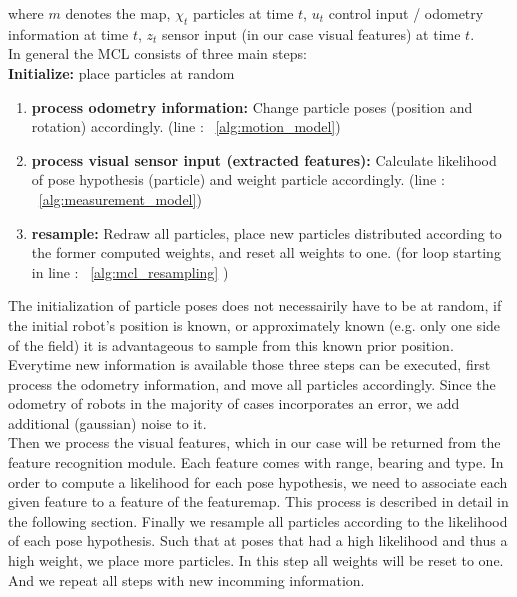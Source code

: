 \documentclass[	DIV=calc,%
							paper=a4,%
							fontsize=9pt,%
							twocolumn]{scrartcl}	 					%
\begin{document}
where $m$ denotes the map, $\chi_t$ particles at time $t$, $u_t$ control input / odometry information at time $t$, $z_t$ sensor input (in our case visual features) at time $t$.
\\
In general the MCL consists of three main steps:\\
\textbf{Initialize:} place particles at random
\begin{enumerate}
\item \textbf{process odometry information:} Change particle poses (position and rotation) accordingly. (line : ~\ref{alg:motion_model})
\item \textbf{process visual sensor input (extracted features):} Calculate likelihood of pose hypothesis (particle) and weight particle accordingly. (line : ~\ref{alg:measurement_model})
\item \textbf{resample:} Redraw all particles, place new particles distributed according to the former computed weights, and reset all weights to one. (for loop starting in line :  ~\ref{alg:mcl_resampling} ) %
\end{enumerate}
The initialization of particle poses does not necessairily have to be at random, if the initial robot's position is known, or approximately known (e.g. only one side of the field) it is advantageous to sample from this known prior position.\\
Everytime new information is available those three steps can be executed, first process the odometry information, and move all particles accordingly. Since the odometry of robots in the majority of cases incorporates an error, we add additional (gaussian) noise to it. \\
Then we process the visual features, which in our case will be returned from the feature recognition module. Each feature comes with range, bearing and type. In order to compute a likelihood for each pose hypothesis, we need to associate each given feature to a feature of the featuremap. This process is described in detail in the following section. Finally we resample all particles according to the likelihood of each pose hypothesis. Such that at poses that had a high likelihood and thus a high weight, we place more particles. In this step all weights will be reset to one. And we repeat all steps with new incomming information.
\end{document}
